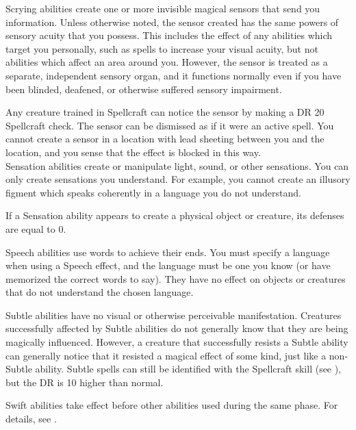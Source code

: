          Scrying abilities create one or more invisible magical sensors that send you information.
        Unless otherwise noted, the sensor created has the same powers of sensory acuity that you possess.
        This includes the effect of any abilities which target you personally, such as spells to increase your visual acuity, but not abilities which affect an area around you.
        However, the sensor is treated as a separate, independent sensory organ, and it functions normally even if you have been blinded, deafened, or otherwise suffered sensory impairment.
        \par Any creature trained in Spellcraft can notice the sensor by making a DR 20 Spellcraft check.
        The sensor can be dismissed as if it were an active spell.
        You cannot create a sensor in a location with lead sheeting between you and the location, and you sense that the effect is blocked in this way.
        \\

         Sensation abilities create or manipulate light, sound, or other sensations.
        You can only create sensations you understand.
        For example, you cannot create an illusory figment which speaks coherently in a language you do not understand.
        \par If a Sensation ability appears to create a physical object or creature, its defenses are equal to 0.

         Speech abilities use words to achieve their ends.
        You must specify a language when using a Speech effect, and the language must be one you know (or have memorized the correct words to say). They have no effect on objects or creatures that do not understand the chosen language.

         Subtle abilities have no visual or otherwise perceivable manifestation.
        Creatures successfully affected by Subtle abilities do not generally know that they are being magically influenced.
        However, a creature that successfully resists a Subtle ability can generally notice that it resisted a magical effect of some kind, just like a non-Subtle ability.
        Subtle spells can still be identified with the Spellcraft skill (see ), but the DR is 10 higher than normal.

         Swift abilities take effect before other abilities used during the same phase.
        For details, see .


